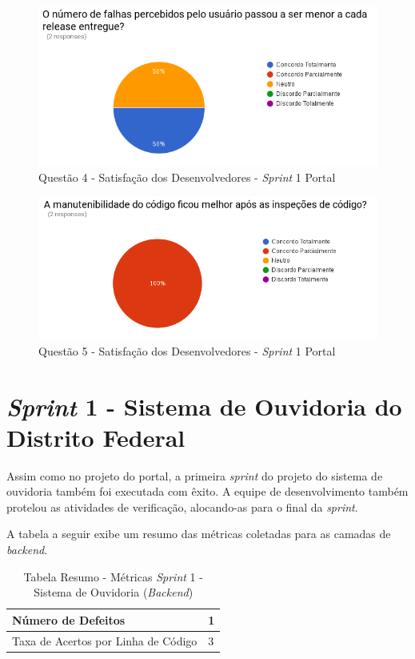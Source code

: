 \begin{figure}[!h]
\includegraphics[width=\textwidth]{figuras/s4p.png}
\caption{Questão 4 - Satisfação dos Desenvolvedores - \textit{Sprint} 1 Portal}
\end{figure}

\begin{figure}[!h]
\includegraphics[width=\textwidth]{figuras/s5p.png}
\caption{Questão 5 - Satisfação dos Desenvolvedores - \textit{Sprint} 1 Portal}
\end{figure}

\clearpage

\section{\textit{Sprint} 1 - Sistema de Ouvidoria do Distrito Federal}

Assim como no projeto do portal, a primeira \textit{sprint} do projeto do sistema de ouvidoria também foi executada com êxito. A equipe de desenvolvimento também protelou as atividades de verificação, alocando-as para o final da \textit{sprint}.

A tabela a seguir exibe um resumo das métricas coletadas para as camadas de \textit{backend}.

\begin{table}[h]
\centering
\begin{tabular}{ | m{8cm} | m{8cm} | } 
\hline
Número de Defeitos & 1 \\ 
\hline
Taxa de Acertos por Linha de Código & 3 \\ 
\hline
\end{tabular}
\caption{Tabela Resumo - Métricas \textit{Sprint} 1 - Sistema de Ouvidoria (\textit{Backend})}\label{table:1}
\end{table}

